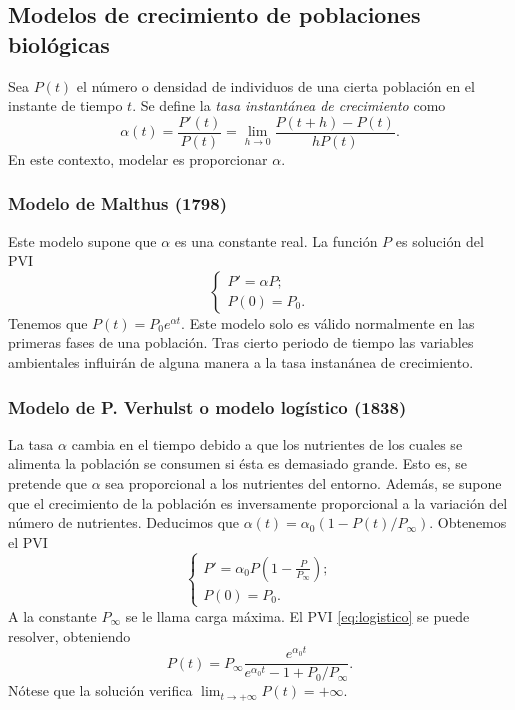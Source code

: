 \documentclass{article}
\begin{document}
\subsection{Modelos de crecimiento de poblaciones biológicas}

Sea $P(t)$ el número o densidad de individuos de una cierta población en el instante de tiempo
$t$. Se define la \emph{tasa instantánea de crecimiento} como 
\[\alpha(t) = \frac{P'(t)}{P(t)} = \lim_{h \to 0} \frac{P(t+h) - P(t)}{h P(t)}.\] 
En este contexto, modelar es proporcionar $\alpha$. 

\subsubsection{Modelo de Malthus (1798)}

Este modelo supone que $\alpha$ es una constante real. La función $P$ es solución del PVI
\begin{equation}
\label{eq:malthus}
\begin{cases}
  P' = \alpha P; \\
  P(0) = P_0.
\end{cases}
\end{equation}
Tenemos que $P(t) = P_0 e^{\alpha t}$. Este modelo solo es válido normalmente en las primeras fases de una población. Tras cierto periodo de tiempo las variables ambientales influirán de alguna manera a la tasa instanánea de crecimiento.

\subsubsection{Modelo de P. Verhulst o modelo logístico (1838) }

La tasa $\alpha$ cambia en el tiempo debido a que los nutrientes de los cuales se alimenta la
población se consumen si ésta es demasiado grande. Esto es, se pretende que $\alpha$ sea
proporcional a los nutrientes del entorno. Además, se supone que el crecimiento de la población es
inversamente proporcional a la variación del número de nutrientes. Deducimos que
$\alpha(t) = \alpha_0 (1 - P(t) / P_{\infty})$. Obtenemos el PVI
\begin{equation}
\label{eq:logistico}
\begin{cases}
  P' = \alpha_0 P (1 - \frac{P}{P_{\infty}}); \\
  P(0) = P_0.
\end{cases}
\end{equation}
A la constante $P_{\infty}$ se le llama carga máxima. El PVI \eqref{eq:logistico} se puede resolver, obteniendo
\[ P(t) = P_{\infty} \frac{e^{\alpha_0 t}}{e^{\alpha_0 t} - 1 + P_0 / P_{\infty}}. \]
Nótese que la solución verifica $\lim_{t \to +\infty} P(t) = +\infty$.
\end{document}
